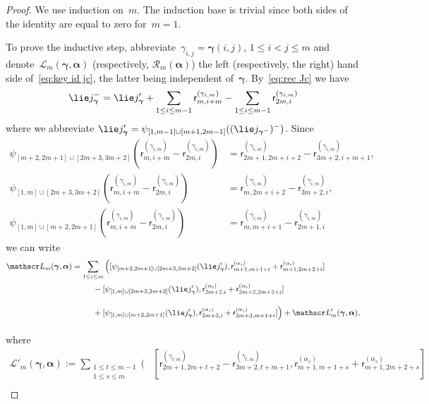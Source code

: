 \documentclass[12pt, reqno]{amsart}
\theoremstyle{definition}
\numberwithin{equation}{section}
\newcommand{\sr}[3]{\mathsf r_{#1,#2}^{(#3)}}
\begin{document}
\begin{proof}
We use induction on~$m$. The induction base is trivial since both sides of the identity are equal to zero for~$m=1$.

To prove the inductive step, abbreviate~$\gamma_{i,j}=\boldsymbol\gamma(i,j)$, $1\le i<j\le m$ and  denote~$\mathscr L_m(\boldsymbol\gamma,\boldsymbol\alpha)$ (respectively, $\mathscr R_m(\boldsymbol \alpha)$) the left (respectively, the right) hand side of~\eqref{eq:key id jc}, the latter being independent of~$\boldsymbol\gamma$.
By~\eqref{eq:rec Jc} we have 
$$
\lie j_{\boldsymbol\gamma}^-=\lie j'_{\boldsymbol\gamma}+
\sum_{1\le i\le m-1} \sr m{i+m}{\gamma_{i,m}}-\sum_{1\le i\le m-1} \sr{2m}{i}{\gamma_{i,m}}
$$
where we abbreviate $
\lie j'_{\boldsymbol\gamma}=\psi_{[1,m-1]\cup[m+1,2m-1]}((\lie j_{\boldsymbol\gamma^-})^-)$.
Since
\begin{align*}
\psi_{[m+2,2m+1]\cup[2m+3,3m+2]}(\sr m{i+m}{\gamma_{i,m}}-\sr{2m}{i}{\gamma_{i,m}})&=\sr{2m+1}{2m+i+2}{\gamma_{i,m}}-\sr{3m+2}{i+m+1}{\gamma_{i,m}},\\
\psi_{[1,m]\cup[2m+3,3m+2]}(\sr m{i+m}{\gamma_{i,m}}-\sr{2m}{i}{\gamma_{i,m}})&=\sr m{2m+i+2}{\gamma_{i,m}}
-\sr{3m+2}{i}{\gamma_{i,m}},\\
\psi_{[1,m]\cup[m+2,2m+1]}(\sr m{i+m}{\gamma_{i,m}}-\sr{2m}{i}{\gamma_{i,m}})&=\sr m{m+i+1}{\gamma_{i,m}}
-\sr{2m+1}{i}{\gamma_{i,m}}
\end{align*}
we can write 
\begin{align*}
\mathscr L_m(\boldsymbol\gamma,\boldsymbol \alpha)&=\sum_{1\le i\le m}\Big([\psi_{[m+2,2m+1]\cup[2m+3,3m+2]}(\lie j'_{\boldsymbol\gamma}),
\sr{m+1}{m+1+i}{\alpha_{i}}+\sr{m+1}{2m+2+i}{\alpha_{i}}]\nonumber\\
&\phantom{\sum_{1\le i\le m}}-[\psi_{[1,m]\cup[2m+3,3m+2]}(\lie j'_{\boldsymbol\gamma}),
\sr{2m+2}{i}{\alpha_{i}}+\sr{2m+2}{2m+2+i}{\alpha_{i}}]\nonumber\\
&\phantom{\sum_{1\le i\le m}}+[\psi_{[1,m]\cup[m+2,2m+1]}(\lie j'_{\boldsymbol\gamma}),
\sr{3m+3}{i}{\alpha_{i}}+\sr{3m+3}{m+1+i}{\alpha_{i}}]\Big)
+\mathscr L'_m(\boldsymbol\gamma,\boldsymbol\alpha),
\end{align*}
where 
\begin{align*}
\mathscr L'_m(\boldsymbol\gamma,\boldsymbol\alpha):=\sum_{\substack{1\le t\le m-1\\1\le s\le m}}
\Big(&[\sr{2m+1}{2m+t+2}{\gamma_{t,m}}-\sr{3m+2}{t+m+1}{\gamma_{t,m}},\sr{m+1}{m+1+s}{\alpha_{s}}+\sr{m+1}{2m+2+s}{\alpha_{s}}]\\

\end{align*}
\end{proof}
\end{document}
